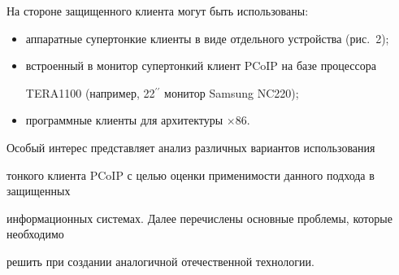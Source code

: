        На стороне защищенного клиента могут быть использованы:


       \begin{itemize}


       \item  аппаратные супертонкие клиенты в виде отдельного устройства (рис.~2);


       \item встроенный в монитор супертонкий клиент PCoIP на базе процессора 


TERA1100 (например, 22$^{\prime\prime}$ монитор Samsung NC220);


       \item программные клиенты для архитектуры $\times86$.


       \end{itemize}


       








       Особый интерес представляет анализ различных вариантов использования 


тонкого клиента PCoIP с целью оценки применимости данного подхода в защищенных 


информационных системах. Далее перечислены основные проблемы, которые необходимо 


решить при создании аналогичной отечественной технологии.


